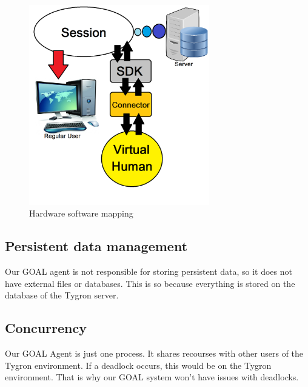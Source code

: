 \begin{figure}
	\centering
	\includegraphics[width=0.7\textwidth]{Hardware_software_mapping}
	\caption{Hardware software mapping}
	\label{fig:Hard_soft_map}
\end{figure}

\subsection{Persistent data management}
Our GOAL agent is not responsible for storing persistent data, so it does not have external files or databases. This is so because everything is stored on the database of the Tygron server.
\subsection{Concurrency}
Our GOAL Agent is just one process. It shares recourses with other users of the Tygron environment. If a deadlock occurs, this would be on the Tygron environment. That is why our GOAL system won't have issues with deadlocks.
\newpage
